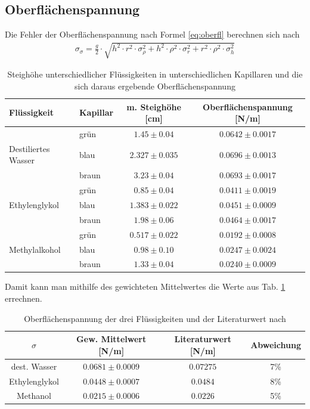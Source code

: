 \documentclass[12pt,a4paper,titlepage,headinclude,bibtotoc]{scrartcl}
\begin{document}
\subsection{Oberflächenspannung}
Die Fehler der Oberflächenspannung nach Formel \eqref{eq:oberfl} berechnen sich nach
\begin{align*}
\sigma_{\sigma}=\frac{g}{2} \cdot \sqrt{h^{2} \cdot r^{2} \cdot \sigma_{\rho}^{2} + h^{2} \cdot \rho^{2} \cdot \sigma_{r}^{2} + r^{2} \cdot \rho^{2} \cdot \sigma_{h}^{2}}
\end{align*}
\begin{table}[!h]
\centering
\begin{tabular}{|l|l|c|c|}
\hline
Flüssigkeit 	     &Kapillar 	& m. Steighöhe [cm]		& Oberflächenspannung [N/m]\\\hline\hline
								&grün	& $1.45\pm 0.04$		&$ 0.0642 \pm 0.0017 $\\
Destiliertes Wasser	&blau	& $2.327\pm 0.035$	&$ 0.0696 \pm 0.0013 $\\
            					&braun	& $3.23\pm 0.04$		&$ 0.0693 \pm 0.0017 $\\\hline
								&grün	& $0.85\pm 0.04$		&$ 0.0411 \pm 0.0019 $\\
Ethylenglykol			&blau	& $1.383\pm 0.022$	&$ 0.0451 \pm 0.0009 $\\
								&braun	& $1.98\pm 0.06$		&$ 0.0464 \pm 0.0017 $\\\hline
								&grün	& $0.517\pm 0.022$	&$ 0.0192 \pm 0.0008 $\\
Methylalkohol			&blau	& $0.98\pm 0.10$		&$ 0.0247 \pm 0.0024 $\\
								&braun	& $1.33\pm 0.04$		&$ 0.0240 \pm 0.0009 $\\
\hline
\end{tabular}
\caption{Steighöhe unterschiedlicher Flüssigkeiten in unterschiedlichen Kapillaren und die sich daraus ergebende Oberflächenspannung}
\end{table}
Damit kann man mithilfe des gewichteten Mittelwertes die Werte aus Tab. \ref{tab:sigma} errechnen.\\

\begin{table}[!h]
\centering
\begin{tabular}{|c||c|c|c|}
\hline
$\sigma$ 		& Gew. Mittelwert [\si{\newton/\meter}]	& Literaturwert [\si{\newton/\meter}]	& Abweichung\\\hline\hline
dest. Wasser 	& $ 0.0681 \pm 0.0009 $						&$0.07275$											&7\%	\\\hline 
Ethylenglykol 	& $ 0.0448 \pm 0.0007 $ 						&$0.0484$											&8\%	\\\hline 
Methanol 			& $ 0.0215 \pm 0.0006 $						&$0.0226$											&5\%	\\ 
\hline 
\end{tabular} 
\caption{Oberflächenspannung der drei Flüssigkeiten und der Literaturwert nach \protect\footnotemark\label{tab:sigma}}
\end{table}
\end{document}
